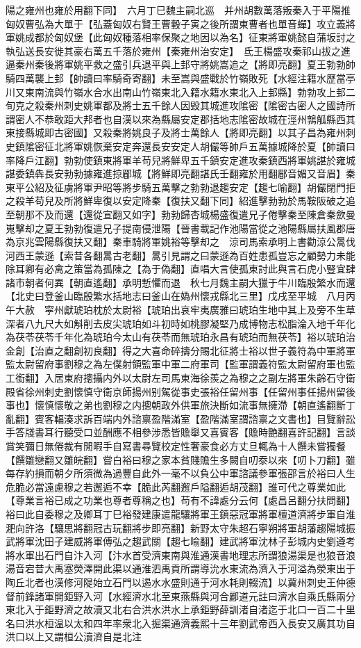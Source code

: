 陽之雍州也雍於用翻下同】　六月丁巳魏主嗣北巡　并州胡數萬落叛秦入于平陽推匈奴曹弘為大單于【弘蓋匈奴右賢王曹轂子寅之後所謂東曹者也單音蟬】攻立義將軍姚成都於匈奴堡【此匈奴種落相率保聚之地因以為名】征東將軍姚懿自蒲坂討之執弘送長安徙其豪右萬五千落於雍州【秦雍州治安定】　氐王楊盛攻秦祁山拔之進逼秦州秦後將軍姚平救之盛引兵退平與上邽守將姚嵩追之【將即亮翻】夏王勃勃帥騎四萬襲上邽【帥讀曰率騎奇寄翻】未至嵩與盛戰於竹嶺敗死【水經注籍水歷當亭川又東南流與竹嶺水合水出南山竹嶺東北入籍水籍水東北入上邽縣】勃勃攻上邽二旬克之殺秦州刺史姚軍都及將士五千餘人因毁其城進攻隂密【隂密古密人之國詩所謂密人不恭敢距大邦者也自漢以來為縣屬安定郡括地志隂密故城在涇州鶉觚縣西其東接縣城即古密國】又殺秦將姚良子及將士萬餘人【將即亮翻】以其子昌為雍州刺史鎮隂密征北將軍姚恢棄安定奔還長安安定人胡儼等帥戶五萬據城降於夏【帥讀曰率降戶江翻】勃勃使鎮東將軍羊苟兒將鮮卑五千鎮安定進攻秦鎮西將軍姚諶於雍城諶委鎮犇長安勃勃據雍進掠郿城【將鮮即亮翻諶氏壬翻雍於用翻郿音媚又音眉】秦東平公紹及征虜將軍尹昭等將步騎五萬擊之勃勃退趨安定【趨七喻翻】胡儼閉門拒之殺羊苟兒及所將鮮卑復以安定降秦【復扶又翻下同】紹進擊勃勃於馬鞍阪破之追至朝那不及而還【還從宣翻又如字】勃勃歸杏城楊盛復遣兄子倦擊秦至陳倉秦歛曼嵬擊却之夏王勃勃復遣兄子提南侵泄陽【晉書載記作池陽當從之池陽縣屬扶風郡唐為京兆雲陽縣復扶又翻】秦車騎將軍姚裕等擊却之　涼司馬索承明上書勸涼公暠伐河西王蒙遜【索昔各翻暠古老翻】暠引見謂之曰蒙遜為百姓患孤豈忘之顧勢力未能除耳卿有必禽之策當為孤陳之【為于偽翻】直唱大言使孤東討此與言石虎小豎宜肆諸市朝者何異【朝直遙翻】承明慙懼而退　秋七月魏主嗣大獵于牛川臨殷繁水而還【北史曰登釜山臨殷繁水括地志曰釜山在媯州懷戎縣北三里】戊戌至平城　八月丙午大赦　寜州獻琥珀枕於太尉裕【琥珀出哀牢夷廣雅曰琥珀生地中其上及旁不生草深者八九尺大如斛削去皮尖琥珀如斗初時如桃膠凝堅乃成博物志松脂淪入地千年化為茯苓茯苓千年化為琥珀今太山有茯苓而無琥珀永昌有琥珀而無茯苓】裕以琥珀治金創【治直之翻創初良翻】得之大喜命碎擣分賜北征將士裕以世子義符為中軍將軍監太尉留府事劉穆之為左僕射領監軍中軍二府軍司【監軍謂義符監太尉留府軍也監工銜翻】入居東府摠攝内外以太尉左司馬東海徐羨之為穆之之副左將軍朱齡石守衛殿省徐州刺史劉懷慎守衛京師揚州别駕從事史張裕任留州事【任留州事任揚州留後事也】懷慎懷敬之弟也劉穆之内摠朝政外供軍旅決斷如流事無擁滯【朝直遙翻斷丁亂翻】賓客輻湊求訴百端内外諮禀盈階滿室【盈階滿室謂諮禀之文書也】目覽辭訟手答牋書耳行聽受口並酬應不相參涉悉皆贍舉又喜賓客【贍時艶翻喜許記翻】言談賞笑彌日無倦裁有閒暇手自寫書尋覽校定性奢豪食必方丈旦輒為十人饌未嘗獨餐【饌雛戀翻又雛皖翻】嘗白裕曰穆之家本貧賤贍生多闕自叨沗以來【叨卜刀翻】雖每存約損而朝夕所須微為過豐自此外一毫不以負公中軍諮議參軍張邵言於裕曰人生危脆必當遠慮穆之若邂逅不幸【脆此芮翻邂戶隘翻逅胡茂翻】誰可代之尊業如此【尊業言裕已成之功業也尊者尊稱之也】苟有不諱處分云何【處昌呂翻分扶問翻】裕曰此自委穆之及卿耳丁巳裕發建康遣龍驤將軍王鎮惡冠軍將軍檀道濟將步軍自淮淝向許洛【驤思將翻冠古玩翻將步即亮翻】新野太守朱超石寧朔將軍胡藩趨陽城振武將軍沈田子建威將軍傅弘之趨武關【趨七喻翻】建武將軍沈林子彭城内史劉遵考將水軍出石門自汴入河【汴水首受濟東南與淮通漢書地理志所謂狼湯渠是也狼音浪湯音宕昔大禹塞熒澤開此渠以通淮泗禹貢所謂導沇水東流為濟入于河溢為滎東出于陶丘北者也漢修河隄始立石門以遏水水盛則通于河水耗則輟流】以冀州刺史王仲德督前鋒諸軍開鉅野入河【水經濟水北至東燕縣與河合酈道元註曰濟水自乘氏縣兩分東北入于鉅野濟之故瀆又北右合洪水洪水上承鉅野薛訓渚自渚迄于北口一百二十里名曰洪水桓温以太和四年率衆北入掘渠通濟義熙十三年劉武帝西入長安又廣其功自洪口以上又謂桓公瀆濟自是北注